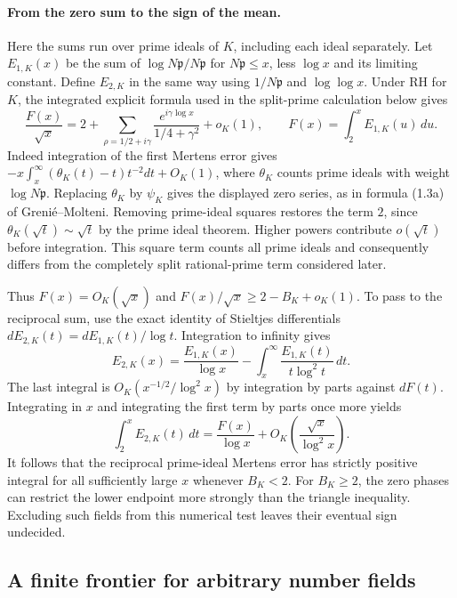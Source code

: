 \documentclass[11pt]{article}
\begin{document}
\paragraph{From the zero sum to the sign of the mean.}
Here the sums run over prime ideals of $K$, including each ideal separately. Let $E_{1,K}(x)$ be the sum of $\log N\mathfrak p/N\mathfrak p$ for $N\mathfrak p\le x$, less $\log x$ and its limiting constant. Define $E_{2,K}$ in the same way using $1/N\mathfrak p$ and $\log\log x$. Under RH for $K$, the integrated explicit formula used in the split-prime calculation below gives
\[
 \frac{F(x)}{\sqrt x}
 =2+\sum_{\rho=1/2+i\gamma}
             \frac{e^{i\gamma\log x}}{1/4+\gamma^2}+o_K(1),
 \qquad F(x)=\int_2^x E_{1,K}(u)\,du .
\]
Indeed integration of the first Mertens error gives $-x\int_x^\infty(\theta_K(t)-t)t^{-2}dt+O_K(1)$, where $\theta_K$ counts prime ideals with weight $\log N\mathfrak p$. Replacing $\theta_K$ by $\psi_K$ gives the displayed zero series, as in formula (1.3a) of Grenié--Molteni. Removing prime-ideal squares restores the term $2$, since $\theta_K(\sqrt t)\sim\sqrt t$ by the prime ideal theorem. Higher powers contribute $o(\sqrt t)$ before integration. This square term counts all prime ideals and consequently differs from the completely split rational-prime term considered later.

Thus $F(x)=O_K(\sqrt x)$ and $F(x)/\sqrt x\ge2-B_K+o_K(1)$. To pass to the reciprocal sum, use the exact identity of Stieltjes differentials $dE_{2,K}(t)=dE_{1,K}(t)/\log t$. Integration to infinity gives
\[
 E_{2,K}(x)=\frac{E_{1,K}(x)}{\log x}
     -\int_x^\infty\frac{E_{1,K}(t)}{t\log^2 t}\,dt .
\]
The last integral is $O_K(x^{-1/2}/\log^2 x)$ by integration by parts against $dF(t)$. Integrating in $x$ and integrating the first term by parts once more yields
\[
 \int_2^x E_{2,K}(t)\,dt
     =\frac{F(x)}{\log x}+O_K\!\left(\frac{\sqrt x}{\log^2 x}\right).
\]
It follows that the reciprocal prime-ideal Mertens error has strictly positive integral for all sufficiently large $x$ whenever $B_K<2$. For $B_K\ge2$, the zero phases can restrict the lower endpoint more strongly than the triangle inequality. Excluding such fields from this numerical test leaves their eventual sign undecided.



\subsection*{A finite frontier for arbitrary number fields}
\end{document}
